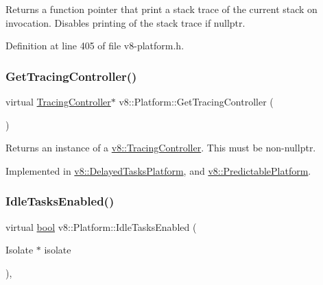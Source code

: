 Returns a function pointer that print a stack trace of the current stack on invocation. Disables printing of the stack trace if nullptr. 

Definition at line 405 of file v8-\/platform.\+h.

\mbox{\label{classv8_1_1Platform_aa760c7bf8c46495eb650d2be72399747}} 
\subsubsection{\texorpdfstring{Get\+Tracing\+Controller()}{GetTracingController()}}
{\footnotesize\ttfamily virtual \mbox{\hyperlink{classv8_1_1TracingController}{Tracing\+Controller}}$\ast$ v8\+::\+Platform\+::\+Get\+Tracing\+Controller (\begin{DoxyParamCaption}{ }\end{DoxyParamCaption})\hspace{0.3cm}{\ttfamily [pure virtual]}}

Returns an instance of a \mbox{\hyperlink{classv8_1_1TracingController}{v8\+::\+Tracing\+Controller}}. This must be non-\/nullptr. 

Implemented in \mbox{\hyperlink{classv8_1_1DelayedTasksPlatform_a7d8406d5b169da8645d65bb06bc8bbc6}{v8\+::\+Delayed\+Tasks\+Platform}}, and \mbox{\hyperlink{classv8_1_1PredictablePlatform_acea822c93bd1f6a51439d21a59aa5d48}{v8\+::\+Predictable\+Platform}}.

\mbox{\label{classv8_1_1Platform_ad229642bf16a066d2e8d866dc128141e}} 
\subsubsection{\texorpdfstring{Idle\+Tasks\+Enabled()}{IdleTasksEnabled()}}
{\footnotesize\ttfamily virtual \mbox{\hyperlink{classbool}{bool}} v8\+::\+Platform\+::\+Idle\+Tasks\+Enabled (\begin{DoxyParamCaption}\item[{Isolate $\ast$}]{isolate }\end{DoxyParamCaption})\hspace{0.3cm}{\ttfamily [inline]}, {\ttfamily [virtual]}}

